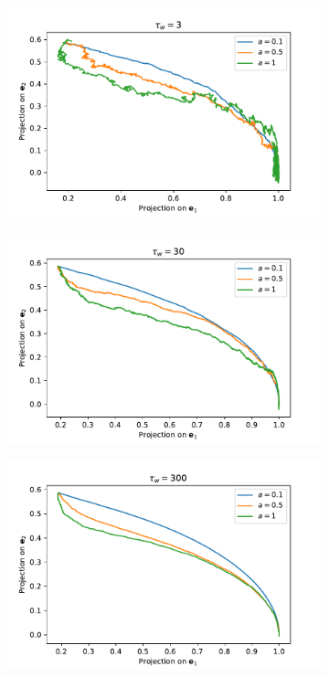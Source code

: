 \documentclass[12pt]{article}
\begin{document}
\begin{figure}[ht]
  \centering
  \captionsetup{width = \textwidth}
  \begin{subfigure}[b]{0.32\textwidth}
    \includegraphics[width=\textwidth]{2.3.pdf}
    \caption{}
    \label{fig:1}
  \end{subfigure}
  \begin{subfigure}[b]{0.32\textwidth}
    \includegraphics[width=\textwidth]{2.30.pdf}
    \caption{}
    \label{fig:2}
  \end{subfigure}
  \begin{subfigure}[b]{0.32\textwidth}
    \includegraphics[width=\textwidth]{2.300.pdf}
    \caption{}
    \label{fig:3}
  \end{subfigure}  
  

\end{figure}
\end{document}
